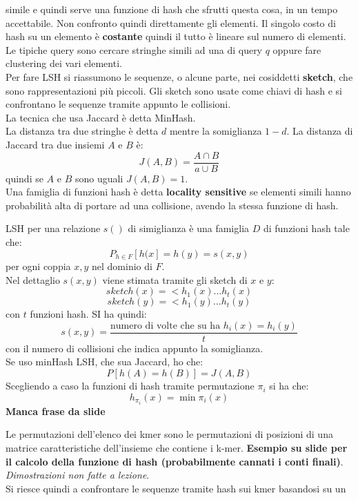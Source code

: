 \documentclass[a4paper,12pt, oneside]{book}
\begin{document}
simile e quindi serve una funzione di hash che sfrutti questa cosa, in un tempo
accettabile. Non confronto quindi direttamente gli elementi.  Il singolo costo
di hash su un elemento è \textbf{costante} quindi il tutto è lineare sul numero
di elementi. \\
Le tipiche query sono cercare stringhe simili ad una di query $q$ oppure fare
clustering dei vari elementi.\\
Per fare LSH si riassumono le sequenze, o alcune parte, nei cosiddetti
\textbf{sketch}, che sono rappresentazioni più piccoli. Gli sketch sono usate
come chiavi di hash e si confrontano le sequenze tramite appunto le
collisioni. \\
La tecnica che usa Jaccard è detta MinHash.\\
La distanza tra due stringhe è detta $d$ mentre la somiglianza $1-d$. La
distanza di Jaccard tra due insiemi $A$ e $B$ è:
\[J(A,B)=\frac{A\cap B}{a\cup B}\]
quindi se $A$ e $B$ sono uguali $J(A,B)=1$.\\
Una famiglia di funzioni hash è detta \textbf{locality sensitive} se elementi
simili hanno probabilità alta di portare ad una collisione, avendo la stessa
funzione di hash.
\begin{definizione}
  LSH per una relazione $s()$ di simiglianza è una famiglia $D$ di funzioni hash
  tale che:
  \[P_{h\in F}[h(x]=h(y)=s(x,y)\]
  per ogni coppia $x,y$ nel dominio di $F$.\\
  Nel dettaglio $s(x,y)$ viene stimata tramite gli sketch di $x$ e $y$:
  \[sketch(x)=<h_1(x)\ldots h_t(x)\]
  \[sketch(y)=<h_1(y)\ldots h_t(y)\]
  con $t$ funzioni hash. SI ha quindi:
  \[s(x,y)=\frac{\mbox{numero di volte che su ha }h_i(x)=h_i(y)}{t}\]
  con il numero di collisioni che indica appunto la somiglianza. \\
  Se uso minHash LSH, che sua Jaccard, ho che:
  \[P[h(A)=h(B)]=J(A,B)\]
  Scegliendo a caso la funzioni di hash tramite permutazione $\pi_i$ si ha che:
  \[h_{\pi_i}(x)=\min\pi_i(x)\]
  \textbf{Manca frase da slide}
\end{definizione}
Le permutazioni dell'elenco dei kmer sono le permutazioni di posizioni di una
matrice caratteristiche dell'insieme che contiene i k-mer.
\textbf{Esempio su slide per il calcolo della funzione di hash
  (probabilmente cannati i conti finali)}.\\
\textit{Dimostrazioni non fatte a lezione}.\\
Si riesce quindi a confrontare le sequenze tramite hash sui kmer basandosi su un
\end{document}
